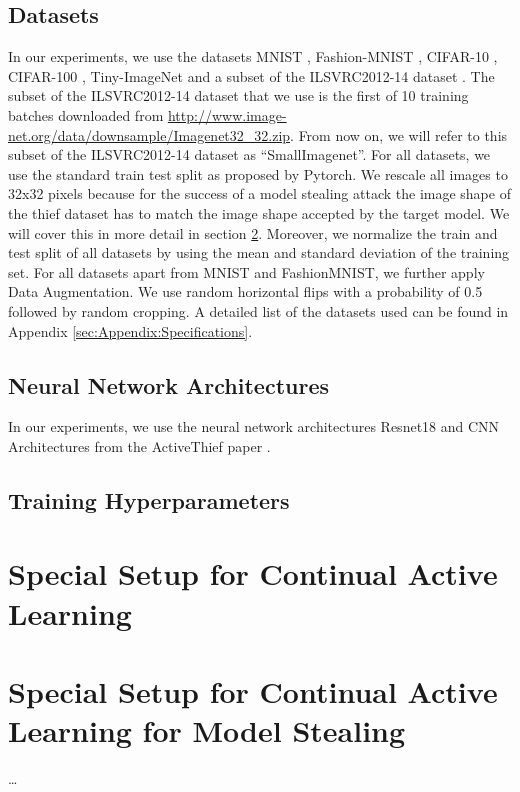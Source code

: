 \subsection{Datasets}
\label{sec:ExperimentSetup:Datasets}
In our experiments, we use the datasets MNIST \cite{mnist_web}, Fashion-MNIST \cite{xiao2017fashion}, CIFAR-10 \cite{cifar},
CIFAR-100 \cite{cifar}, Tiny-ImageNet \cite{le2015tiny} and a subset of the ILSVRC2012-14 dataset \cite{imagenet}. The subset of the ILSVRC2012-14 dataset that we
use is the first of 10 training batches downloaded from \url{http://www.image-net.org/data/downsample/Imagenet32_32.zip}. From now on, we will refer to this subset
of the ILSVRC2012-14 dataset as \enquote{SmallImagenet}. For all datasets, we use the standard train test split as proposed by Pytorch. We rescale all images to 32x32
pixels because for the success of a model stealing attack the image shape of the thief dataset has to match the image shape accepted by the target model. We will cover
this in more detail in section \ref{sec:Methodology:CALMSsetup}. Moreover, we normalize the train and test split of all datasets by using the mean and standard deviation
of the training set. For all datasets apart from MNIST and FashionMNIST, we further apply Data Augmentation. We use random horizontal flips with a probability of 0.5
followed by random cropping. A detailed list of the datasets used can be found in Appendix \ref{sec:Appendix:Specifications}. \par

\subsection{Neural Network Architectures}
\label{sec:ExperimentSetup:NNArchitectures}
In our experiments, we use the neural network architectures Resnet18 \cite{he2016deep} and CNN Architectures from the ActiveThief paper \cite{pal2020activethief}.


\subsection{Training Hyperparameters}
\label{sec:ExperimentSetup:Hyperparameters}

\section{Special Setup for Continual Active Learning}
\label{sec:Methodology:CALsetup}


\section{Special Setup for Continual Active Learning for Model Stealing}
\label{sec:Methodology:CALMSsetup}

\dots
